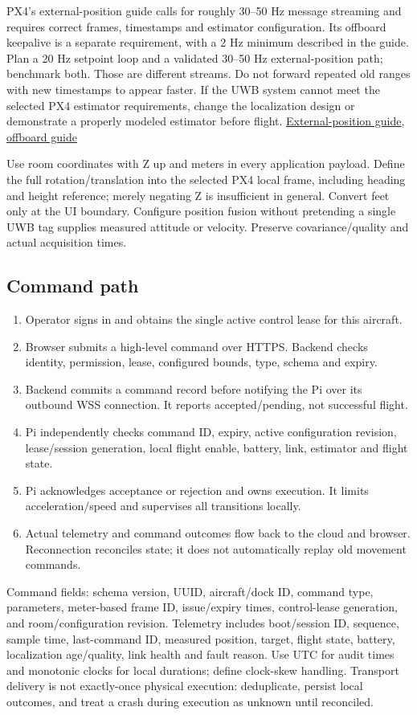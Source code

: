 \documentclass[10pt,letterpaper]{article}
\begin{document}
PX4's external-position guide calls for roughly 30--50 Hz message streaming and requires correct frames, timestamps and estimator configuration. Its offboard keepalive is a separate requirement, with a 2 Hz minimum described in the guide. Plan a 20 Hz setpoint loop and a validated 30--50 Hz external-position path; benchmark both. Those are different streams. Do not forward repeated old ranges with new timestamps to appear faster. If the UWB system cannot meet the selected PX4 estimator requirements, change the localization design or demonstrate a properly modeled estimator before flight. \href{https://docs.px4.io/main/en/ros/external_position_estimation}{External-position guide}, \href{https://docs.px4.io/main/en/flight_modes/offboard}{offboard guide}

Use room coordinates with Z up and meters in every application payload. Define the full rotation/translation into the selected PX4 local frame, including heading and height reference; merely negating Z is insufficient in general. Convert feet only at the UI boundary. Configure position fusion without pretending a single UWB tag supplies measured attitude or velocity. Preserve covariance/quality and actual acquisition times.

\subsection{Command path}
\begin{enumerate}
\item Operator signs in and obtains the single active control lease for this aircraft.
\item Browser submits a high-level command over HTTPS. Backend checks identity, permission, lease, configured bounds, type, schema and expiry.
\item Backend commits a command record before notifying the Pi over its outbound WSS connection. It reports accepted/pending, not successful flight.
\item Pi independently checks command ID, expiry, active configuration revision, lease/session generation, local flight enable, battery, link, estimator and flight state.
\item Pi acknowledges acceptance or rejection and owns execution. It limits acceleration/speed and supervises all transitions locally.
\item Actual telemetry and command outcomes flow back to the cloud and browser. Reconnection reconciles state; it does not automatically replay old movement commands.
\end{enumerate}
Command fields: schema version, UUID, aircraft/dock ID, command type, parameters, meter-based frame ID, issue/expiry times, control-lease generation, and room/configuration revision. Telemetry includes boot/session ID, sequence, sample time, last-command ID, measured position, target, flight state, battery, localization age/quality, link health and fault reason. Use UTC for audit times and monotonic clocks for local durations; define clock-skew handling. Transport delivery is not exactly-once physical execution: deduplicate, persist local outcomes, and treat a crash during execution as unknown until reconciled.
\end{document}
